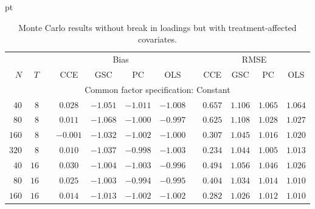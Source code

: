 \documentclass[12pt,fleqn]{article}
\begin{document}
  \begin{table}[H]
  \caption{Monte Carlo results without break in loadings but with treatment-affected covariates.}\label{tab:mc_x_affect}
   pt
  \centering
  \par
  \begin{tabular}{rrcccccccccc}
  \hline\hline
   {\small $$} & {\small $$} & {\small $$} & \multicolumn{4}{c}{\small Bias} & {\small $$} & \multicolumn{4}{c}{\small RMSE}\\ \cline{4-7}\cline{9-12}
   {\small $N$} & {\small $T$} & {\small $$} & {\small CCE} & {\small GSC} & {\small PC} & {\small OLS} & {\small $$} & {\small CCE} & {\small GSC} & {\small PC} & {\small OLS} \\\hline
   \multicolumn{12}{c}{\small Common factor specification: Constant}\\
  {\small $40$} & {\small $8$} & {\small $$} & {\small $0.028$} & {\small $-1.051$} & {\small $-1.011$} & {\small $-1.008$} & {\small $$} & {\small $0.657$} & {\small $1.106$} & {\small $1.065$} & {\small $1.064$} \\
   {\small $80$} & {\small $8$} & {\small $$} & {\small $0.011$} & {\small $-1.068$} & {\small $-1.000$} & {\small $-0.997$} & {\small $$} & {\small $0.625$} & {\small $1.108$} & {\small $1.028$} & {\small $1.027$} \\
   {\small $160$} & {\small $8$} & {\small $$} & {\small $-0.001$} & {\small $-1.032$} & {\small $-1.002$} & {\small $-1.000$} & {\small $$} & {\small $0.307$} & {\small $1.045$} & {\small $1.016$} & {\small $1.020$} \\
   {\small $320$} & {\small $8$} & {\small $$} & {\small $0.010$} & {\small $-1.037$} & {\small $-0.998$} & {\small $-1.003$} & {\small $$} & {\small $0.234$} & {\small $1.044$} & {\small $1.005$} & {\small $1.013$} \\
   {\small $40$} & {\small $16$} & {\small $$} & {\small $0.030$} & {\small $-1.004$} & {\small $-1.003$} & {\small $-0.996$} & {\small $$} & {\small $0.494$} & {\small $1.056$} & {\small $1.046$} & {\small $1.026$} \\
   {\small $80$} & {\small $16$} & {\small $$} & {\small $0.025$} & {\small $-1.003$} & {\small $-0.994$} & {\small $-0.995$} & {\small $$} & {\small $0.404$} & {\small $1.034$} & {\small $1.014$} & {\small $1.010$} \\
   {\small $160$} & {\small $16$} & {\small $$} & {\small $0.014$} & {\small $-1.013$} & {\small $-1.002$} & {\small $-1.002$} & {\small $$} & {\small $0.282$} & {\small $1.026$} & {\small $1.012$} & {\small $1.010$} \\

\end{tabular}
\end{table}
\end{document}
